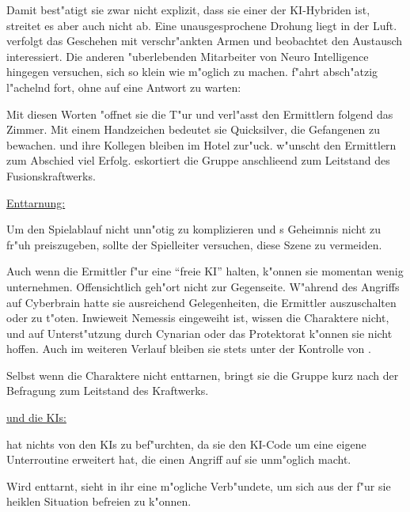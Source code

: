 
Damit best"atigt sie zwar nicht explizit, dass sie einer der KI-Hybriden ist, streitet es aber auch nicht ab. Eine unausgesprochene Drohung liegt in der Luft. \ml{} verfolgt das Geschehen mit verschr"ankten Armen und beobachtet den Austausch interessiert. Die anderen "uberlebenden Mitarbeiter von Neuro Intelligence hingegen versuchen, sich so klein wie m"oglich zu machen. \xl{} f"ahrt absch"atzig l"achelnd fort, ohne auf eine Antwort zu warten:


Mit diesen Worten "offnet sie die T"ur und verl"asst den Ermittlern folgend das Zimmer. Mit einem Handzeichen bedeutet sie Quicksilver, die Gefangenen zu bewachen. \ml{} und ihre Kollegen bleiben im Hotel zur"uck. \ml{} w"unscht den Ermittlern zum Abschied viel Erfolg. \xl{} eskortiert die Gruppe anschlie\3end zum Leitstand des Fusionskraftwerks.
\vfill

\begin{remarks}
	\underline{Enttarnung:}

	Um den Spielablauf nicht unn"otig zu komplizieren und \xl{}s Geheimnis nicht zu fr"uh preiszugeben, sollte der Spielleiter versuchen, diese Szene zu vermeiden.

	Auch wenn die Ermittler \xl{} f"ur eine ``freie KI'' halten, k"onnen sie momentan wenig unternehmen. Offensichtlich geh"ort \xl{} nicht zur Gegenseite. W"ahrend des Angriffs auf Cyberbrain hatte sie ausreichend Gelegenheiten, die Ermittler auszuschalten oder \ml{} zu t"oten. Inwieweit Nemessis eingeweiht ist, wissen die Charaktere nicht, und auf Unterst"utzung durch Cynarian oder das Protektorat k"onnen sie nicht hoffen. Auch im weiteren Verlauf bleiben sie stets unter der Kontrolle von \xl{}.
	
	Selbst wenn die Charaktere \xl{} nicht enttarnen, bringt sie die Gruppe kurz nach der Befragung zum Leitstand des Kraftwerks.
\end{remarks}

\begin{remarks}	
	\underline{\ml{} und die KIs:}

	\ml{} hat nichts von den KIs zu bef"urchten, da sie den KI-Code um eine eigene Unterroutine erweitert hat, die einen Angriff auf sie unm"oglich macht.

	Wird \xl{} enttarnt, sieht \ml{} in ihr eine m"ogliche Verb"undete, um sich aus der f"ur sie heiklen Situation befreien zu k"onnen.
\end{remarks}
